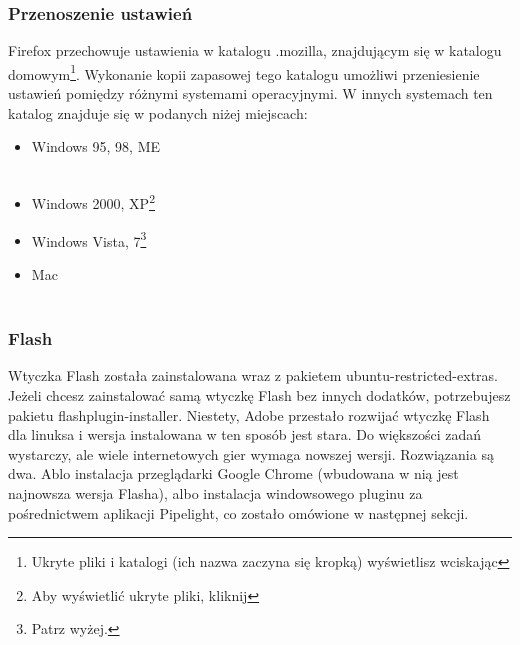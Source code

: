 \subsubsection{Przenoszenie ustawień}
Firefox przechowuje ustawienia w katalogu .mozilla, znajdującym się w katalogu domowym\footnote{Ukryte pliki i katalogi (ich nazwa zaczyna się kropką) wyświetlisz wciskając }. Wykonanie kopii zapasowej tego katalogu umożliwi przeniesienie ustawień pomiędzy różnymi systemami operacyjnymi. W innych systemach ten katalog znajduje się w podanych niżej miejscach:
\begin{itemize}
\item Windows 95, 98, ME\\
\\
\item Windows 2000, XP\footnote{Aby wyświetlić ukryte pliki, kliknij }\\
\item Windows Vista, 7\footnote{Patrz wyżej.}\\
\item Mac\\
\\
\end{itemize}

\subsubsection{Flash}
Wtyczka Flash została zainstalowana wraz z pakietem \textcolor{ubuntu_orange}{ubuntu-restricted-extras}. Jeżeli chcesz zainstalować samą wtyczkę Flash bez innych dodatków, potrzebujesz pakietu \textcolor{ubuntu_orange}{flashplugin-installer}. Niestety, Adobe przestało rozwijać wtyczkę Flash dla linuksa i wersja instalowana w ten sposób jest stara. Do większości zadań wystarczy, ale wiele internetowych gier wymaga nowszej wersji. Rozwiązania są dwa. Ablo instalacja przeglądarki Google Chrome (wbudowana w nią jest najnowsza wersja Flasha), albo instalacja windowsowego pluginu za pośrednictwem aplikacji Pipelight, co zostało omówione w następnej sekcji.

